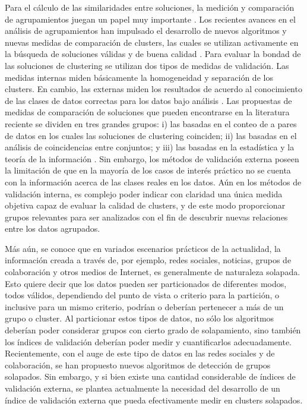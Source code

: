 \documentclass[a4paper,8pt]{article}
\begin{document}
Para el cálculo de las similaridades entre soluciones, la medición y comparación de agrupamientos juegan un papel muy importante \cite{Xu09}. Los recientes avances en el análisis de agrupamientos han impulsado el desarrollo de nuevos algoritmos y nuevas medidas de comparación de clusters, las cuales se utilizan activamente en la búsqueda de soluciones válidas y de buena calidad \cite{NguyenEB10}. 
Para evaluar la bondad de las soluciones de clustering se utilizan dos tipos de medidas de validación. Las medidas internas miden básicamente la homogeneidad y separación de los clusters. En cambio, las externas miden los resultados de acuerdo al conocimiento de las clases de datos correctas para los datos bajo análisis \cite{Halkidi01,Handl05}.
Las propuestas de medidas de comparación de soluciones que pueden encontrarse en la literatura reciente se dividen en tres grandes grupos: i) las basadas en el conteo de a pares de datos en los cuales las soluciones de clustering coinciden; ii) las basadas en el análisis de coincidencias entre conjuntos; y iii) las basadas en la estadística y la teoría de la información \cite{Meila2001,Meila2007,NguyenEB10}. 
Sin embargo, los métodos de validación externa poseen la limitación de que en la mayoría
de los casos de interés práctico no se cuenta con la información acerca de las clases reales en los
datos. Aún en los métodos de validación interna, es complejo poder indicar con claridad una única
medida objetiva capaz de evaluar la calidad de clusters, y de este modo proporcionar grupos
relevantes para ser analizados con el fin de descubrir nuevas relaciones entre los datos agrupados.

Más aún, se conoce que en variados escenarios prácticos de la actualidad, la información creada a través de, por ejemplo, redes sociales, noticias, grupos de colaboración y otros medios de Internet, es generalmente de naturaleza solapada. Esto quiere decir que los datos pueden ser particionados de diferentes modos, todos válidos, dependiendo del punto de vista o criterio para la partición, o inclusive para un mismo criterio, podrían o deberían pertenecer a más de un grupo o cluster. Al particionar estos tipos de datos, no sólo los algoritmos deberían poder considerar grupos con cierto grado de solapamiento, sino también los índices de validación deberían poder medir y cuantificarlos adecuadamente.
Recientemente, con el auge de este tipo de datos en las redes sociales y de colaboración, se han propuesto nuevos  algoritmos de detección de grupos solapados\cite{wang_discovering_2014, alvari_discovering_2013, gopalan_efficient_2013, gossen_graph_2014, chakraborty_leveraging_2015, xie_overlapping_2013, amelio_overlapping_2014}. Sin embargo, y si bien existe una cantidad considerable de índices de validación externa\cite{brun_model-based_2007, wu_external_2009}, se plantea actualmente la necesidad del desarrollo de un índice de validación externa que pueda efectivamente medir en clusters solapados.
\end{document}
